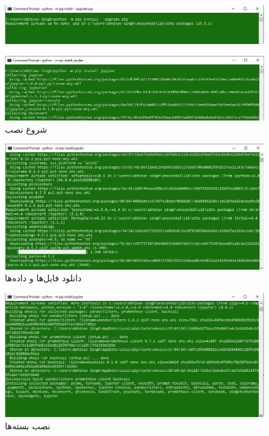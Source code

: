 \documentclass{article}
\begin{document}
\begin{figure}[H]
    \centering
    \includegraphics[width=1.0\textwidth]{figures/7.jpg}
    \caption
	{}
    \label{fig:fig1}
\end{figure}
\begin{figure}[H]
    \centering
    \includegraphics[width=1.0\textwidth]{figures/8.jpg}
    \caption
	{شروع نصب}
    \label{fig:fig1}
\end{figure}
\begin{figure}[H]
    \centering
    \includegraphics[width=1.0\textwidth]{figures/9.jpg}
    \caption
	{دانلود فایل‌ها و داده‌ها}
    \label{fig:fig1}
\end{figure}
\begin{figure}[H]
    \centering
    \includegraphics[width=1.0\textwidth]{figures/10.jpg}
    \caption
	{نصب بسته‌ها}
    \label{fig:fig1}
\end{figure}
\end{document}
